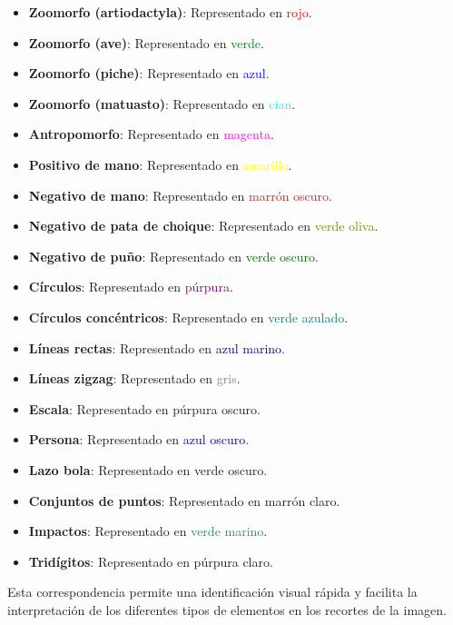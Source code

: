 \begin{itemize}
    \item \textbf{Zoomorfo (artiodactyla)}: Representado en \textcolor{red}{rojo}.
    \item \textbf{Zoomorfo (ave)}: Representado en \textcolor{green}{verde}.
    \item \textbf{Zoomorfo (piche)}: Representado en \textcolor{blue}{azul}.
    \item \textbf{Zoomorfo (matuasto)}: Representado en \textcolor{cyan}{cian}.
    \item \textbf{Antropomorfo}: Representado en \textcolor{magenta}{magenta}.
    \item \textbf{Positivo de mano}: Representado en \textcolor{yellow}{amarillo}.
    \item \textbf{Negativo de mano}: Representado en \textcolor{brown}{marrón oscuro}.
    \item \textbf{Negativo de pata de choique}: Representado en \textcolor{olive}{verde oliva}.
    \item \textbf{Negativo de puño}: Representado en \textcolor{darkgreen}{verde oscuro}.
    \item \textbf{Círculos}: Representado en \textcolor{purple}{púrpura}.
    \item \textbf{Círculos concéntricos}: Representado en \textcolor{teal}{verde azulado}.
    \item \textbf{Líneas rectas}: Representado en \textcolor{navy}{azul marino}.
    \item \textbf{Líneas zigzag}: Representado en \textcolor{gray}{gris}.
    \item \textbf{Escala}: Representado en \textcolor{darkpurple}{púrpura oscuro}.
    \item \textbf{Persona}: Representado en \textcolor{darkblue}{azul oscuro}.
    \item \textbf{Lazo bola}: Representado en \textcolor{darkgreen2}{verde oscuro}.
    \item \textbf{Conjuntos de puntos}: Representado en \textcolor{brown2}{marrón claro}.
    \item \textbf{Impactos}: Representado en \textcolor{seagreen}{verde marino}.
    \item \textbf{Tridígitos}: Representado en \textcolor{lightpurple}{púrpura claro}.
\end{itemize}

Esta correspondencia permite una identificación visual rápida y facilita la interpretación de los diferentes tipos de elementos en los recortes de la imagen.

